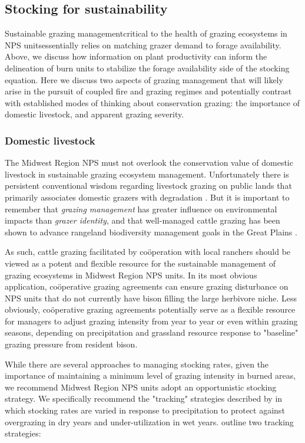 \subsection{Stocking for sustainability}

Sustainable grazing management\textemdash critical to the health of grazing ecosystems in NPS units\textemdash essentially relies on matching grazer demand to forage availability. 
Above, we discuss how information on plant productivity can inform the delineation of burn units to stabilize the forage availability side of the stocking equation. 
Here we discuss two aspects of grazing management that will likely arise in the pursuit of coupled fire and grazing regimes and potentially contrast with established modes of thinking about conservation grazing: the importance of domestic livestock, and apparent grazing severity. 

\subsubsection{Domestic livestock}

The Midwest Region NPS must not overlook the conservation value of domestic livestock in sustainable grazing ecosystem management.
Unfortunately there is persistent conventional wisdom regarding livestock grazing on public lands that primarily associates domestic grazers with degradation \citep{fleischner1994}. 
But it is important to remember that \emph{grazing management} has greater influence on environmental impacts than \emph{grazer identity}, and that well-managed cattle grazing has been shown to advance rangeland biodiversity management goals in the Great Plains \citep{ahlering2016, allred2011}. 

As such, cattle grazing facilitated by co\"{o}peration with local ranchers should be viewed as a potent and flexible resource for the sustainable management of grazing ecosystems in Midwest Region NPS units. 
In its most obvious application, co\"{o}perative grazing agreements can ensure grazing disturbance on NPS units that do not currently have bison filling the large herbivore niche. 
Less obviously, co\"{o}perative grazing agreements potentially serve as a flexible resource for managers to adjust grazing intensity from year to year or even within grazing seasons, depending on precipitation and grassland resource response to "baseline" grazing pressure from resident bison. 

While there are several approaches to managing stocking rates, given the importance of maintaining a minimum level of grazing intensity in burned areas, we recommend Midwest Region NPS units adopt an opportunistic stocking strategy. 
We specifically recommend the "tracking" strategies described by \citet{campbell2006} in which stocking rates are varied in response to precipitation to protect against overgrazing in dry years and under-utilization in wet years. 
\citet{campbell2006} outline two tracking strategies: 

